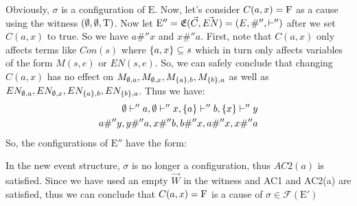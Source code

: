 \begin{example}
    Obviously, $\sigma$ is a configuration of $\mathrm{E}$.
    Now, let's consider $C(a,x) = \mathrm{F}$ as a cause using the witness
    $(\emptyset,\emptyset,\mathrm{T})$.
    Now let $\mathrm{E}'' = \mathfrak{E}(\vec C,\vec {EN}) = (E, \#'',\vdash'')$ after we set $C(a,x)$ to true. So we have $a\#''x$ and $x\#''a$.
    First, note that $C(a,x)$ only affects terms like $Con(s)$
    where $ \{a,x\} \subseteq s$ which in turn only affects
    variables of the form $M(s,e)$ or $EN(s,e)$.
    So, we can safely conclude that changing $C(a,x)$ has no effect
    on $M_{\emptyset,a},M_{\emptyset,x},M_{\{a\},b},M_{\{b\},a}$ as well as
    $EN_{\emptyset,a},EN_{\emptyset,x},EN_{\{a\},b},EN_{\{b\},a}$.
    Thus we have:
    \begin{align*}
        \emptyset \vdash'' a,
        \emptyset \vdash'' x,
        \{a\} \vdash'' b,
        \{x\} \vdash'' y \\
        a\#''y,y\#''a,x\#''b,b\#''x,a\#''x, x\#''a
    \end{align*}
    So, the configurations of $\mathrm{E}''$ have the form:
    \begin{center}
    \end{center}
    In the new event structure, $\sigma$ is no longer a configuration, thus $AC2(a)$ is satisfied.
    Since we have used an empty $\vec W$ in the witness and AC1 and AC2(a)
    are satisfied, thus we can conclude that $C(a,x) = \mathrm{F}$ is a cause of
    $\sigma \in \mathcal{F}(\mathrm{E}')$


\end{example}

